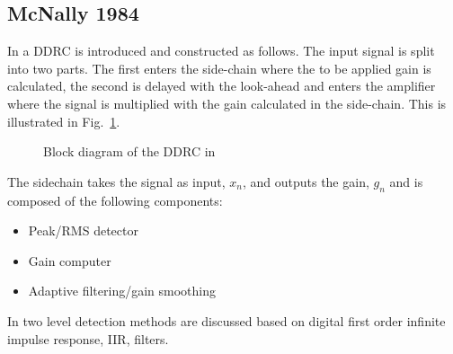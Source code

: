 \documentclass[../main2.tex]{subfiles}
\providecommand{\rootdir}{..}
\begin{document}
\subsection{McNally 1984}
In \cite{mcnally1984dynamic} a DDRC is introduced and constructed as follows. The input signal is split into two parts. The first enters the side-chain where the to be applied gain is calculated, the second is delayed with the look-ahead and enters the amplifier where the signal is multiplied with the gain calculated in the side-chain. This is illustrated in Fig.~\ref{fig:block_mcnally_theory1}. %
\begin{figure}
\centerline{}
\caption{Block diagram of the DDRC in \cite{mcnally1984dynamic}}
\label{fig:block_mcnally_theory1}
\end{figure}

The sidechain takes the signal as input, $x_n$, and outputs the gain, $g_n$ and is composed of the following components:%
\begin{itemize}
\item{Peak/RMS detector}
\item{Gain computer}
\item{Adaptive filtering/gain smoothing}
\end{itemize}
In \cite{mcnally1984dynamic} two level detection methods are discussed based on digital first order infinite impulse response, IIR, filters.
\end{document}
